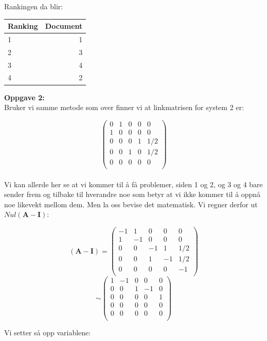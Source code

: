 \documentclass[a4paper,norsk,11pt,twoside]{article}
\begin{document}
Rankingen da blir:


\begin{center}
\begin{tabular}{l | r}
Ranking & Document \\ \hline
1 & 1\\
2 & 3\\
3 & 4\\
4 & 2
\end{tabular}
\end{center}

\newpage

\textbf{Oppgave 2:}\\

Bruker vi samme metode som over finner vi at linkmatrisen for system 2 er:

$$
\begin{pmatrix}
0 & 1 & 0 & 0 & 0\\
1 & 0 & 0 & 0 & 0\\
0 & 0 & 0 & 1 & 1/2\\
0 & 0 & 1 & 0 & 1/2\\
0 & 0 & 0 & 0 & 0\\
\end{pmatrix}
$$\\

Vi kan allerde her se at vi kommer til å få problemer, siden 1 og 2, og 3 og 4 bare sender frem og tilbake til hverandre noe som betyr at vi ikke kommer til å oppnå noe likevekt mellom dem. Men la oss bevise det matematisk. Vi regner derfor ut $Nul(\textbf{A}-\textbf{I})$:

$$
(\textbf{A}-\textbf{I}) = 
\begin{pmatrix}
-1 & 1 & 0 & 0 & 0\\
1 & -1 & 0 & 0 & 0\\
0 & 0 & -1 & 1 & 1/2\\
0 & 0 & 1 & -1 & 1/2\\
0 & 0 & 0 & 0 & -1\\
\end{pmatrix}
$$
$$
\sim
\begin{pmatrix}
1 & -1 & 0 & 0 & 0\\
0 & 0 & 1 & -1 & 0\\
0 & 0 & 0 & 0 & 1\\
0 & 0 & 0 & 0 & 0\\
0 & 0 & 0 & 0 & 0\\
\end{pmatrix}
$$

Vi setter så opp variablene:
\end{document}

